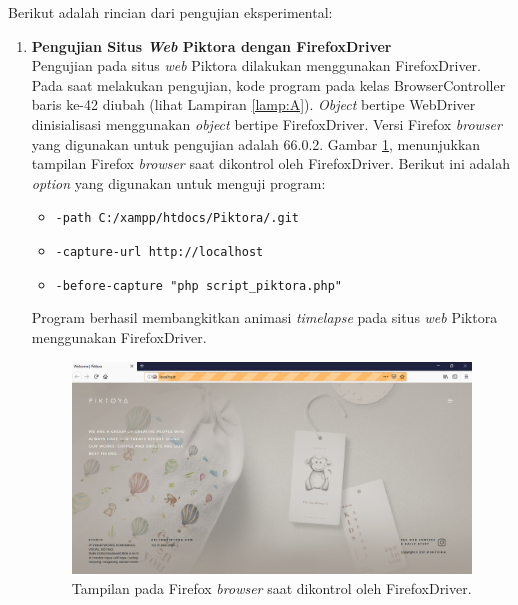 Berikut adalah rincian dari pengujian eksperimental:

\begin{enumerate}
\item \textbf{Pengujian Situs \textit{Web} Piktora dengan FirefoxDriver}\\
Pengujian pada situs \textit{web} Piktora dilakukan menggunakan FirefoxDriver. Pada saat melakukan pengujian, kode program pada kelas BrowserController baris ke-42  diubah (lihat Lampiran \ref{lamp:A}). \textit{Object} bertipe WebDriver dinisialisasi menggunakan \textit{object} bertipe FirefoxDriver. Versi Firefox \textit{browser} yang digunakan untuk pengujian adalah 66.0.2. Gambar \ref{fig:firefox}, menunjukkan tampilan Firefox \textit{browser} saat dikontrol oleh FirefoxDriver. Berikut ini adalah \textit{option} yang digunakan untuk menguji program:
\begin{itemize}
\item \texttt{-path C:/xampp/htdocs/Piktora/.git}
\item \texttt{-capture-url http://localhost}
\item \texttt{-before-capture "php script\_piktora.php"}
\end{itemize}
Program berhasil membangkitkan animasi \textit{timelapse} pada situs \textit{web} Piktora menggunakan FirefoxDriver.

\begin{figure}[H]
	\centering
		\includegraphics[scale=0.4]{Gambar/Firefox.png}
	\caption{Tampilan pada Firefox \textit{browser} saat dikontrol oleh FirefoxDriver.}
	\label{fig:firefox}
\end{figure}





\end{enumerate}
